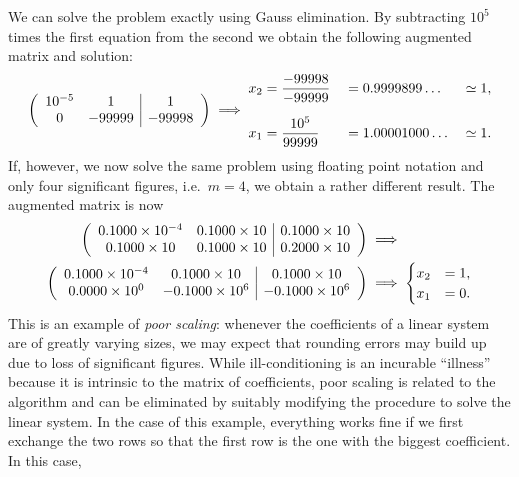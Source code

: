 We can solve the problem exactly using Gauss elimination.   By
subtracting $10^5$ times the first equation from the second  we obtain
the following augmented matrix and solution:
%
\begin{equation*}
  \left (
   \begin{array}{c c|c}
    10^{-5} & 1 & 1 \\
    0 & -99999 & -99998
   \end{array}
  \right )
  \implies
  \begin{aligned}
    x_2 &=  \dfrac{-99998}{-99999} &&= 0.9999899\ldots && \simeq 1 , \\*[2mm]
    x_1 &=  \dfrac{10^5}{99999} &&= 1.00001000\ldots && \simeq 1 .
  \end{aligned}
\end{equation*}
%
If, however, we now solve the same problem using floating point
notation and only four significant figures, i.e.\ $m=4$, we obtain a
rather different result.    The augmented matrix is now
%
\begin{align}
   \left (
    \begin{array}{c c|c}
      0.1000 \times 10^{-4} & 0.1000 \times 10 & 0.1000 \times 10 \\
      0.1000 \times 10 & 0.1000 \times 10 & 0.2000 \times 10
    \end{array}
  \right ) & \implies \\
   \left (
    \begin{array}{c c|c}
      0.1000 \times 10^{-4} & 0.1000 \times 10 & 0.1000 \times 10 \\
      0.0000 \times 10^{0} & -0.1000 \times 10^6 & -0.1000 \times 10^6
    \end{array}
  \right ) & \implies
  \begin{cases}
    x_2 &= 1, \\ x_1 &= 0 .
  \end{cases}
\end{align}
%
This is an example of \textit{poor scaling}: whenever the coefficients
of a linear system are of greatly varying sizes, we may expect that
rounding errors may build up due to loss of significant figures.
While ill-conditioning is an incurable ``illness'' because it is
intrinsic to the matrix of coefficients, poor scaling is related
to the algorithm and can be eliminated by suitably modifying the
procedure to solve the linear system.     In the case of this example,
everything works fine if we first exchange the two rows so that the
first row is the one with the biggest coefficient.    In this case,
